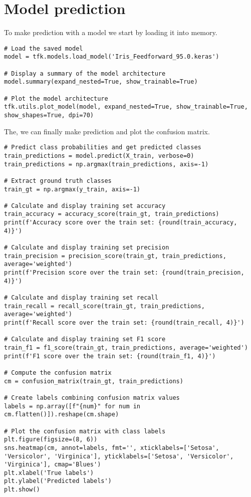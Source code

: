 \section{Model prediction}

To make prediction with a model we start by loading it into memory. 
\begin{lstlisting}[style=Python]
# Load the saved model
model = tfk.models.load_model('Iris_Feedforward_95.0.keras')

# Display a summary of the model architecture
model.summary(expand_nested=True, show_trainable=True)

# Plot the model architecture
tfk.utils.plot_model(model, expand_nested=True, show_trainable=True, show_shapes=True, dpi=70)
\end{lstlisting}
The, we can finally make prediction and plot the confusion matrix.
\begin{lstlisting}[style=Python]
# Predict class probabilities and get predicted classes
train_predictions = model.predict(X_train, verbose=0)
train_predictions = np.argmax(train_predictions, axis=-1)

# Extract ground truth classes
train_gt = np.argmax(y_train, axis=-1)

# Calculate and display training set accuracy
train_accuracy = accuracy_score(train_gt, train_predictions)
print(f'Accuracy score over the train set: {round(train_accuracy, 4)}')

# Calculate and display training set precision
train_precision = precision_score(train_gt, train_predictions, average='weighted')
print(f'Precision score over the train set: {round(train_precision, 4)}')

# Calculate and display training set recall
train_recall = recall_score(train_gt, train_predictions, average='weighted')
print(f'Recall score over the train set: {round(train_recall, 4)}')

# Calculate and display training set F1 score
train_f1 = f1_score(train_gt, train_predictions, average='weighted')
print(f'F1 score over the train set: {round(train_f1, 4)}')

# Compute the confusion matrix
cm = confusion_matrix(train_gt, train_predictions)

# Create labels combining confusion matrix values
labels = np.array([f"{num}" for num in cm.flatten()]).reshape(cm.shape)

# Plot the confusion matrix with class labels
plt.figure(figsize=(8, 6))
sns.heatmap(cm, annot=labels, fmt='', xticklabels=['Setosa', 'Versicolor', 'Virginica'], yticklabels=['Setosa', 'Versicolor', 'Virginica'], cmap='Blues')
plt.xlabel('True labels')
plt.ylabel('Predicted labels')
plt.show()
\end{lstlisting}